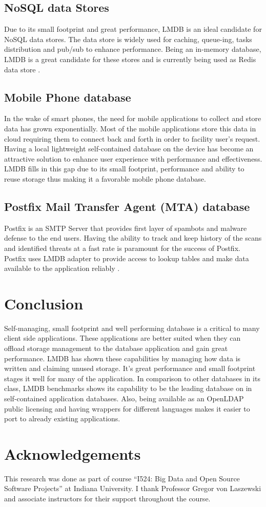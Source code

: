 \documentclass[9pt,twocolumn,twoside]{../../styles/osajnl}
\begin{document}
\subsection{NoSQL data Stores}

Due to its small footprint and great performance, LMDB is an ideal
candidate for NoSQL data stores. The data store is widely used for
caching, queue-ing, tasks distribution and pub/sub to enhance
performance. Being an in-memory database, LMDB is a great candidate
for these stores and is currently being used as Redis data store
\cite{www-kyoto}.

\subsection{Mobile Phone database}

In the wake of smart phones, the need for mobile
applications to collect and store data has grown exponentially. Most
of the mobile applications store this data in cloud requiring them to
connect back and forth in order to facility user’s request. Having a
local lightweight self-contained database on the device has become an
attractive solution to enhance user experience with performance and
effectiveness. LMDB fills in this gap due to its small footprint,
performance and ability to reuse storage thus making it a favorable
mobile phone database.

\subsection{Postfix Mail Transfer Agent (MTA) database}

Postfix is an SMTP Server that provides first layer of spambots and
malware defense to the end users. Having the ability to track and keep
history of the scans and identified threats at a fast rate is
paramount for the success of Postfix. Postfix uses LMDB adapter to
provide access to lookup tables and make data available to the
application reliably \cite{www-postfix}.

\section{Conclusion}

Self-managing, small footprint and well performing database is a
critical to many client side applications.  These applications are
better suited when they can offload storage management to the database
application and gain great performance. LMDB has shown these
capabilities by managing how data is written and claiming unused
storage. It’s great performance and small footprint stages it well for
many of the application. In comparison to other databases in its
class, LMDB benchmarks \cite{www-benchmark} shows its capability to be
the leading database on in self-contained application databases. Also,
being available as an OpenLDAP public licensing and having wrappers
for different languages makes it easier to port to already existing
applications.

\section*{Acknowledgements}
This research was done as part of course “I524: Big Data and Open
Source Software Projects” at Indiana University. I thank Professor
Gregor von Laszewski and associate instructors for their support
throughout the course.



 
\end{document}
